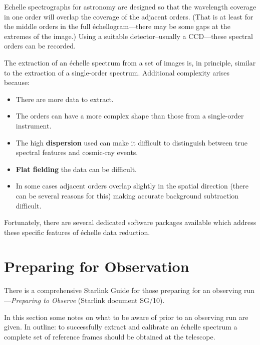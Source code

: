 \documentclass[twoside,11pt]{article}
\newcommand{\stardocinitials}  {SG}
\newcommand{\stardocnumber}    {9.2}
\newcommand{\stardocname}{\stardocinitials /\stardocnumber}
\newcommand{\htmlref}[2]{#1}
\newcommand{\xref}[3]{#1}
\newcommand{\xlabel}[1]{}
\newcommand{\sgspec}[2]{#1}
\newcommand{\sgspec}[2]{#2}
\begin{document}
Echelle spectrographs for astronomy are designed so that the wavelength
coverage in one order will overlap the coverage of the adjacent orders.
(That is at least for the middle orders in the full
\'{e}chellogram\sgspec{---}{ - }there
may be some gaps at the extremes of the image.)  Using a suitable
detector\sgspec{--}{-}usually a CCD\sgspec{---}{ - }these spectral
orders can be recorded.

The extraction of an \'{e}chelle spectrum from a set of images is, in
principle, similar to the extraction of a single-order spectrum.
Additional complexity arises because:

\begin{itemize}

\item There are more data to extract.

\item The orders can have a more complex shape than those from a
      single-order instrument.

\item The high \htmlref{{\bf dispersion}}{gl_dispersion} used can make
      it difficult to distinguish
      between true spectral features and cosmic-ray events.

\item \htmlref{{\bf Flat fielding}}{gl_flat_field} the data can be difficult.

\item In some cases adjacent orders overlap slightly in the spatial
      direction (there can be several reasons for this) making
      accurate background subtraction difficult.

\end{itemize}

Fortunately, there are several dedicated software packages available
which address these specific features of \'{e}chelle data reduction.

\section{\label{se_preparation}\xlabel{preparation}Preparing for Observation}
\markboth{Preparing for Observation}{\stardocname}

There is a comprehensive Starlink Guide for those preparing for
an observing run\sgspec{---}{ - }\xref{{\sl Preparing to Observe}
(Starlink document SG/10)}{sg10}{}.

In this section some notes on what to be aware of prior to an observing
run are given.
In outline: to successfully extract and calibrate an \'{e}chelle spectrum
a complete set of reference frames should be obtained at the telescope.
\end{document}
